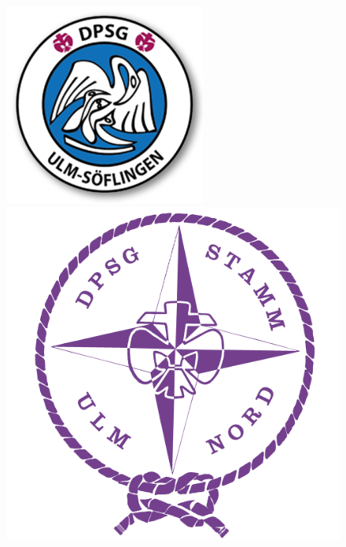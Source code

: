 \begin{titlepage}
    \vspace*{\fill}
    \begin{center}
        \begin{figure}[h!]
            \centering
            \begin{minipage}{.2\linewidth}
                \centering
                \includegraphics[width=\textwidth]{../img/dpsg_ulm-soeflingen.png}
            \end{minipage}%
            \begin{minipage}{.2\linewidth}
                \centering
                \vspace{12pt}
                \includegraphics[width=\textwidth]{../img/dpsg_ulm-nord.png}

\end{minipage}
\end{figure}
\end{center}
\end{titlepage}
